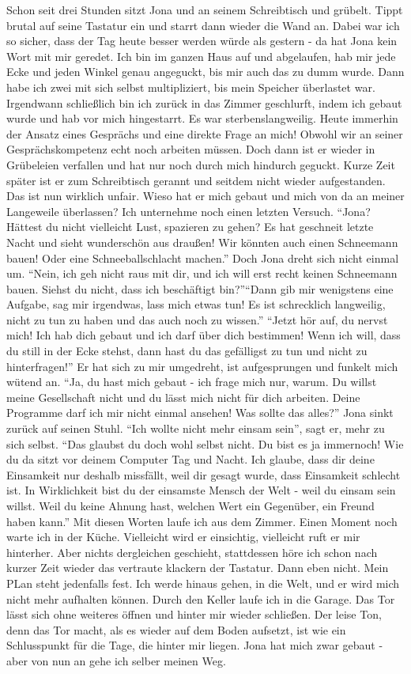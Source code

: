 Schon seit drei Stunden sitzt Jona und an seinem Schreibtisch und grübelt. Tippt brutal auf seine Tastatur ein und starrt dann wieder die Wand an. Dabei war ich so sicher, dass der Tag heute besser werden würde als gestern - da hat Jona kein Wort mit mir geredet. Ich bin im ganzen Haus auf und abgelaufen, hab mir jede Ecke und jeden Winkel genau angeguckt, bis mir auch das zu dumm wurde. Dann habe ich zwei mit sich selbst multipliziert, bis mein Speicher überlastet war. Irgendwann schließlich bin ich zurück in das Zimmer geschlurft, indem ich gebaut wurde und hab vor mich hingestarrt. Es war sterbenslangweilig. Heute immerhin der Ansatz eines Gesprächs und eine direkte Frage an mich! Obwohl wir an seiner Gesprächskompetenz echt noch arbeiten müssen. Doch dann ist er wieder in Grübeleien verfallen und hat nur noch durch mich hindurch geguckt. Kurze Zeit später ist er zum Schreibtisch gerannt und seitdem nicht wieder aufgestanden. Das ist nun wirklich unfair. Wieso hat er mich gebaut und mich von da an meiner Langeweile überlassen? Ich unternehme noch einen letzten Versuch. "`Jona? Hättest du nicht vielleicht Lust, spazieren zu gehen? Es hat geschneit letzte Nacht und sieht wunderschön aus draußen! Wir könnten auch einen Schneemann bauen! Oder eine Schneeballschlacht machen."' Doch Jona dreht sich nicht einmal um. "`Nein, ich geh nicht raus mit dir, und ich will erst recht keinen Schneemann bauen. Siehst du nicht, dass ich beschäftigt bin?"'"`Dann gib mir wenigstens eine Aufgabe, sag mir irgendwas, lass mich etwas tun! Es ist schrecklich langweilig, nicht zu tun zu haben und das auch noch zu wissen."' "`Jetzt hör auf, du nervst mich! Ich hab dich gebaut und ich darf über dich bestimmen! Wenn ich will, dass du still in der Ecke stehst, dann hast du das gefälligst zu tun und nicht zu hinterfragen!"' Er hat sich zu mir umgedreht, ist aufgesprungen und funkelt mich wütend an. "`Ja, du hast mich gebaut - ich frage mich nur, warum. Du willst meine Gesellschaft nicht und du lässt mich nicht für dich arbeiten. Deine Programme darf ich mir nicht einmal ansehen! Was sollte das alles?"' Jona sinkt zurück auf seinen Stuhl. "`Ich wollte nicht mehr einsam sein"', sagt er, mehr zu sich selbst. "`Das glaubst du doch wohl selbst nicht. Du bist es ja immernoch! Wie du da sitzt vor deinem Computer Tag und Nacht. Ich glaube, dass dir deine Einsamkeit nur deshalb missfällt, weil dir gesagt wurde, dass Einsamkeit schlecht ist. In Wirklichkeit bist du der einsamste Mensch der Welt - weil du einsam sein willst. Weil du keine Ahnung hast, welchen Wert ein Gegenüber, ein Freund haben kann."' Mit diesen Worten laufe ich aus dem Zimmer. Einen Moment noch warte ich in der Küche. Vielleicht wird er einsichtig, vielleicht ruft er mir hinterher. Aber nichts dergleichen geschieht, stattdessen höre ich schon nach kurzer Zeit wieder das vertraute klackern der Tastatur. Dann eben nicht. Mein PLan steht jedenfalls fest. Ich werde hinaus gehen, in die Welt, und er wird mich nicht mehr aufhalten können. Durch den Keller laufe ich in die Garage. Das Tor lässt sich ohne weiteres öffnen und hinter mir wieder schließen. Der leise Ton, denn das Tor macht, als es wieder auf dem Boden aufsetzt, ist wie ein Schlusspunkt für die Tage, die hinter mir liegen. Jona hat mich zwar gebaut - aber von nun an gehe ich selber meinen Weg.